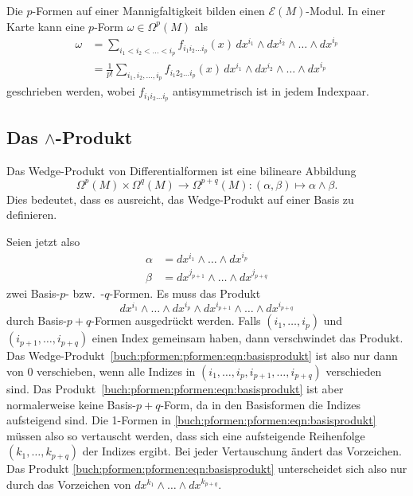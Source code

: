 \begin{satz}
Die $p$-Formen auf einer Mannigfaltigkeit bilden einen $\mathscr{E}(M)$-Modul.
In einer Karte kann eine $p$-Form $\omega\in \Omega^p(M)$ als
\begin{align*}
\omega
&=
\sum_{i_1<i_2<\dots< i_p}
f_{i_1 i_2\dots i_p}(x)
\, dx^{i_1}\wedge dx^{i_2}\wedge\dots\wedge dx^{i_p}
\\
&=
\frac{1}{p!}
\sum_{i_1,i_2,\dots,i_p}
f_{i_1 2_2\dots i_p}(x)
\, dx^{i_1}\wedge dx^{i_2}\wedge\dots\wedge dx^{i_p}
\end{align*}
geschrieben werden, wobei $f_{i_1 i_2\dots i_p}$  antisymmetrisch ist in jedem
Indexpaar.
\end{satz}

%
%
\subsection{Das $\wedge$-Produkt}
Das Wedge-Produkt von Differentialformen ist eine bilineare Abbildung
\[
\Omega^p(M)\times \Omega^q(M) \to \Omega^{p+q}(M)
:
(\alpha,\beta) \mapsto \alpha\wedge\beta.
\]
Dies bedeutet, dass es ausreicht, das Wedge-Produkt auf einer Basis
zu definieren.

Seien jetzt also
\begin{align*}
\alpha &= dx^{i_1}\wedge\dots\wedge dx^{i_p} \\
\beta  &= dx^{j_{p+1}}\wedge\dots\wedge dx^{j_{p+q}}
\end{align*}
zwei Basis-$p$- bzw.~-$q$-Formen.
Es muss das Produkt
\begin{equation}
dx^{i_1}\wedge\dots\wedge dx^{i_p}
\wedge
dx^{i_{p+1}}\wedge\dots\wedge dx^{i_{p+q}}
\label{buch:pformen:pformen:eqn:basisprodukt}
\end{equation}
durch Basis-$p+q$-Formen ausgedrückt werden.
Falls $(i_1,\dots,i_p)$ und $(i_{p+1},\dots,i_{p+q})$ einen Index gemeinsam
haben, dann verschwindet das Produkt.
Das Wedge-Produkt~\eqref{buch:pformen:pformen:eqn:basisprodukt}
ist also nur dann von $0$ verschieben, wenn alle Indizes in
$(i_1,\dots,i_p,i_{p+1},\dots,i_{p+q})$ verschieden sind.
Das Produkt~\eqref{buch:pformen:pformen:eqn:basisprodukt} ist aber
normalerweise keine Basis-$p+q$-Form, da in den Basisformen die
Indizes aufsteigend sind.
Die 1-Formen in \eqref{buch:pformen:pformen:eqn:basisprodukt} müssen
also so vertauscht werden, dass sich eine aufsteigende Reihenfolge
$(k_1,\dots,k_{p+q})$
der Indizes ergibt.
Bei jeder Vertauschung ändert das Vorzeichen.
Das Produkt \eqref{buch:pformen:pformen:eqn:basisprodukt} unterscheidet
sich also nur durch das Vorzeichen von 
\(
dx^{k_1}\wedge\dots\wedge dx^{k_{p+q}}
\).


